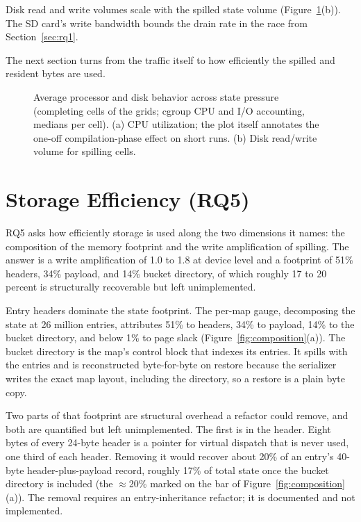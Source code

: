 Disk read and write volumes scale with the spilled state volume (Figure~\ref{fig:cpu-io}(b)).
The SD card's write bandwidth bounds the drain rate in the race from Section~\ref{sec:rq1}.

The next section turns from the traffic itself to how efficiently the spilled and resident bytes are used.

\begin{figure}[htbp]
\centering
{}
\caption[Average processor and disk behavior across state pressure]{Average
processor and disk behavior across state pressure (completing cells of the grids;
cgroup CPU and I/O accounting, medians per cell). (a) CPU utilization; the
plot itself annotates the one-off compilation-phase effect on short runs. (b)
Disk read/write volume for spilling cells.\methodsnote}
\label{fig:cpu-io}
\end{figure}

\section{Storage Efficiency (RQ5)\label{sec:rq5}}

RQ5 asks how efficiently storage is used along the two dimensions it names: the composition of the memory footprint and the write amplification of spilling.
The answer is a write amplification of 1.0 to 1.8 at device level and a footprint of 51\% headers, 34\% payload, and 14\% bucket directory, of which roughly 17 to 20 percent is structurally recoverable but left unimplemented.

Entry headers dominate the state footprint.
The per-map gauge, decomposing the state at 26 million entries, attributes 51\% to headers, 34\% to payload, 14\% to the bucket directory, and below 1\% to page slack (Figure~\ref{fig:composition}(a)).
The bucket directory is the map's control block that indexes its entries.
It spills with the entries and is reconstructed byte-for-byte on restore because the serializer writes the exact map layout, including the directory, so a restore is a plain byte copy.

Two parts of that footprint are structural overhead a refactor could remove, and both are quantified but left unimplemented.
The first is in the header.
Eight bytes of every 24-byte header is a pointer for virtual dispatch that is never used, one third of each header.
Removing it would recover about 20\% of an entry's 40-byte header-plus-payload record, roughly 17\% of total state once the bucket directory is included (the $\approx$20\% marked on the bar of Figure~\ref{fig:composition}(a)).
The removal requires an entry-inheritance refactor; it is documented and not implemented.

